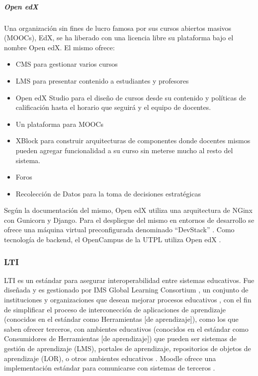 \subparagraph{Open edX}
Una organización sin fines de lucro famosa por sus cursos abiertos masivos (MOOCs), EdX, se ha liberado con una licencia libre su plataforma bajo el nombre Open edX. El mismo ofrece:
\begin{itemize}
	\item CMS para gestionar varios cursos
    \item LMS para presentar contenido a estudiantes y profesores
    \item Open edX Studio para el diseño de cursos desde su contenido y políticas de calificación hasta el horario que seguirá y el equipo de docentes.
    \item Un plataforma para MOOCs
    \item XBlock para construir arquitecturas de componentes donde docentes mismos pueden agregar funcionalidad a su curso sin meterse mucho al resto del sistema.
    \item Foros
    \item Recolección de Datos para la toma de decisiones estratégicas
\end{itemize}
Según la documentación del mismo, Open edX utiliza una arquitectura de NGinx con Gunicorn y Django. Para el despliegue del mismo en entornos de desarrollo se ofrece una máquina virtual preconfigurada denominado “DevStack” \citep{edX-About-Open-edX}. Como tecnología de backend, el OpenCampus de la UTPL utiliza Open edX \citep{Lopez-Jorge}.

\subsubsection{LTI}
LTI es un estándar para asegurar interoperabilidad entre sistemas educativos. Fue diseñada y es gestionado por IMS Global Learning Consortium \citep{IMS-Global-LTI}, un conjunto de instituciones y organizaciones que desean mejorar procesos educativos \citep{IMS-Global-Members}, con el fin de simplificar el proceso de interconección de aplicaciones de aprendizaje (conocidos en el estándar como Herramientas [de aprendizaje]), como los que saben ofrecer terceros, con ambientes educativos (conocidos en el estándar como Consumidores de Herramientas [de aprendizaje]) que pueden ser sistemas de gestión de aprendizaje (LMS), portales de aprendizaje, repositorios de objetos de aprendizaje (LOR), o otros ambientes educativos \citep{IMS-Global-LTI}. Moodle ofrece una implementación estándar para comunicarse con sistemas de terceros \citep{MOODLE-DOCS-Features}.

